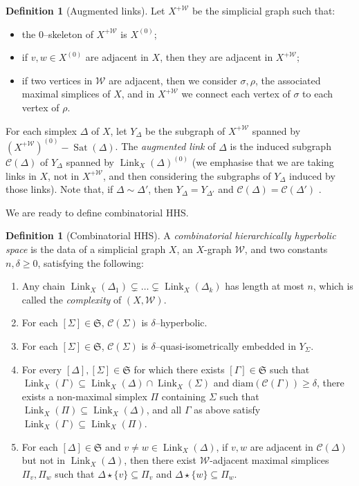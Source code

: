 \documentclass[svgnames]{amsart}
\theoremstyle{plain}
\theoremstyle{definition}
\newtheorem{defn}[thm]{Definition}
\newcommand{\frakS}{\mathfrak S}
\newcommand{\C}[1]{\mathcal{C}(#1)}
\newcommand{\diam}{\mathrm{diam}}
\newcommand{\link}[2]{\operatorname{Link}_{#1}\left(#2\right)}
\newcommand{\W}{\mathcal{W}}
\newcommand{\duaug}[2]{{#1}^{+{#2}}}
\newcommand{\Sat}{\operatorname{Sat}}
\begin{document}
\begin{defn}[Augmented links]\label{defn:complement}
Let $\duaug{X}{\mathcal{W}}$ be the simplicial graph such that:
\begin{itemize}
     \item the $0$--skeleton of $\duaug{X}{\mathcal{W}}$ is $X^{(0)}$;
     \item if $v,w\in X^{(0)}$ are adjacent in $X$, then they are adjacent in $\duaug{X}{\mathcal W}$; 	
     \item if two vertices in $\mathcal W$ are adjacent, then we consider $\sigma,\rho$, the associated maximal simplices of $X$, and in $\duaug{X}{\mathcal W}$ we connect each vertex of $\sigma$ to each vertex of $\rho$.
\end{itemize}
 For each simplex $\Delta$ of $X$, let $Y_\Delta$ be the subgraph of $\duaug{X}{\mathcal W}$ spanned by $(\duaug{X}{\mathcal W})^{(0)}-\Sat(\Delta)$. The \emph{augmented link} of $\Delta$ is the induced subgraph $\C{\Delta}$ of $Y_\Delta$ spanned by $\link{X}{\Delta}^{(0)}$ (we emphasise that we are taking links in $X$, not in $\duaug{X}{\mathcal W}$, and then considering the subgraphs of $Y_\Delta$ induced by those links). Note that, if $\Delta\sim\Delta'$, then $Y_{\Delta}=Y_{\Delta'}$ and  $\C{\Delta}=\C{\Delta'}$ . 
\end{defn}


We are ready to define combinatorial HHS.

\begin{defn}[Combinatorial HHS]\label{def:combHHS}
A \emph{combinatorial hierarchically hyperbolic space} is the data of a simplicial graph $X$, an $X$-graph $\W$, and two constants $n,\delta\ge 0$, satisfying the following:
\begin{enumerate}[label=(\arabic*)]
\item \label{CHHS_def_complexity} Any chain $\link{X}{\Delta_1}\subsetneq\dots\subsetneq\link{X}{\Delta_k}$ has length at most $n$, which is called the \emph{complexity} of $(X,\W)$.
\item \label{CHHS_def_hyperbolicity} For each $[\Sigma]\in \frakS$,  $\C{\Sigma}$ is $\delta$--hyperbolic.
\item \label{CHHS_def_qi_emb} For each $[\Sigma]\in \frakS$, $\C{\Sigma}$ is $\delta$--quasi-isometrically embedded in $Y_\Sigma$.
\item \label{CHHS_def_lk_cap_lk} For every $[\Delta],[\Sigma]\in \frakS$ for which there exists $[\Gamma]\in\frakS$ such that $\link{X}{\Gamma}\subseteq \link{X}{\Delta}\cap \link{X}{\Sigma}$ and $\diam(\C{\Gamma})\geq \delta$, there exists a non-maximal simplex $\Pi$ containing $\Sigma$ such that $\link{X}{\Pi}\subseteq \link{X}{\Delta}$, and all $\Gamma$ as above satisfy $\link{X}{\Gamma}\subseteq \link{X}{\Pi}$.
\item \label{CHHS_def_edge_in_link} For each $[\Delta]\in \frakS$ and $v\neq w\in \link{X}{\Delta}$, if $v,w$ are adjacent in $\C{\Delta}$ but not in $\link{X}{\Delta}$, then there exist $\mathcal W$-adjacent maximal simplices $\Pi_v,\Pi_w$ such that $\Delta\star \{v\}\subseteq \Pi_v$ and $\Delta\star \{w\}\subseteq \Pi_w$.
\end{enumerate}
\end{defn}
\end{document}
